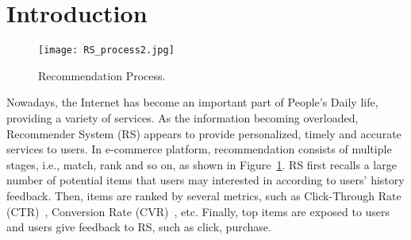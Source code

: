 \documentclass[sigconf]{acmart}
\begin{document}


\maketitle

\section{Introduction}

\begin{figure}
\centering
\texttt{[image: RS\_process2.jpg]} 
\vskip -10pt
\caption{Recommendation Process.}   
\label{fig:RS_process}  
\vskip -10pt
\end{figure}

Nowadays, the Internet has become an important part of People's Daily life, providing a variety of services. As the information becoming overloaded, Recommender System (RS) appears to provide personalized, timely and accurate services to users. In e-commerce platform, recommendation consists of multiple stages, i.e., match, rank and so on, as shown in Figure~\ref{fig:RS_process}. RS first recalls a large number of potential items that users may interested in according to users’ history feedback. Then, items are ranked by several metrics, such as Click-Through Rate (CTR)~\cite{2017DIN,2019DIEN}, Conversion Rate (CVR)~\cite{2018CVR,2019CVR}, etc. Finally, top items are exposed to users and users give feedback to RS, such as click, purchase. 
\end{document}
